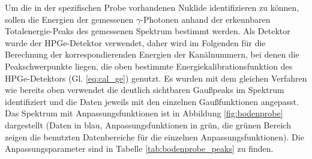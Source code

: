 Um die in der spezifischen Probe vorhandenen Nuklide identifizieren zu können, sollen die Energien der gemessenen $\gamma$-Photonen anhand der erkennbaren Totalenergie-Peaks des gemessenen Spektrum bestimmt werden. Als Detektor wurde der HPGe-Detektor verwendet, daher wird im Folgenden für die Berechnung der korrespondierenden Energien der Kanälnummern, bei denen die Peakschwerpunkte liegen, die oben bestimmte Energiekalibrationsfunktion des HPGe-Detektors (Gl. \ref{eq:cal_ge}) genutzt.
Es wurden mit dem gleichen Verfahren wie bereits oben verwendet die deutlich sichtbaren Gaußpeaks im Spektrum identifiziert und die Daten jeweils mit den einzelnen Gaußfunktionen angepasst. Das Spektrum mit Anpassungsfunktionen ist in Abbildung \ref{fig:bodenprobe} dargestellt (Daten in blau, Anpassungsfunktionen in grün, die grünen Bereich zeigen die benutzten Datenbereiche für die einzelnen Anpassungsfunktionen). Die Anpassungsparameter sind in Tabelle \ref{tab:bodenprobe_peaks} zu finden.


% 

